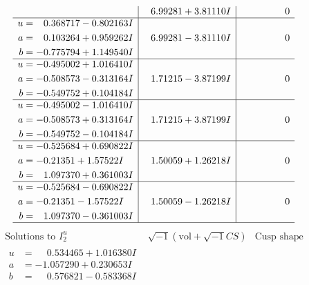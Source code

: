 \documentclass[1p]{elsarticle_modified}
\theoremstyle{definition}
\newcommand{\I}{\sqrt{-1}}
\begin{document}
$$\begin{array}{c|c|c}
 & \phantom{-}6.99281 + 3.81110 I & \phantom{-0.000000 } 0 \\ \hline\begin{aligned}
u &= \phantom{-}0.368717 - 0.802163 I \\
a &= \phantom{-}0.103264 + 0.959262 I \\
b &= -0.775794 + 1.149540 I\end{aligned}
 & \phantom{-}6.99281 - 3.81110 I & \phantom{-0.000000 } 0 \\ \hline\begin{aligned}
u &= -0.495002 + 1.016410 I \\
a &= -0.508573 - 0.313164 I \\
b &= -0.549752 + 0.104184 I\end{aligned}
 & \phantom{-}1.71215 - 3.87199 I & \phantom{-0.000000 } 0 \\ \hline\begin{aligned}
u &= -0.495002 - 1.016410 I \\
a &= -0.508573 + 0.313164 I \\
b &= -0.549752 - 0.104184 I\end{aligned}
 & \phantom{-}1.71215 + 3.87199 I & \phantom{-0.000000 } 0 \\ \hline\begin{aligned}
u &= -0.525684 + 0.690822 I \\
a &= -0.21351 + 1.57522 I \\
b &= \phantom{-}1.097370 + 0.361003 I\end{aligned}
 & \phantom{-}1.50059 + 1.26218 I & \phantom{-0.000000 } 0 \\ \hline\begin{aligned}
u &= -0.525684 - 0.690822 I \\
a &= -0.21351 - 1.57522 I \\
b &= \phantom{-}1.097370 - 0.361003 I\end{aligned}
 & \phantom{-}1.50059 - 1.26218 I & \phantom{-0.000000 } 0\\
 \hline 
 \end{array}$$\newpage$$\begin{array}{c|c|c}  
\text{Solutions to }I^u_{2}& \I (\text{vol} + \sqrt{-1}CS) & \text{Cusp shape}\\
 \hline 
\begin{aligned}
u &= \phantom{-}0.534465 + 1.016380 I \\
a &= -1.057290 + 0.230653 I \\
b &= \phantom{-}0.576821 - 0.583368 I\end{aligned}

\end{array}$$
\end{document}
